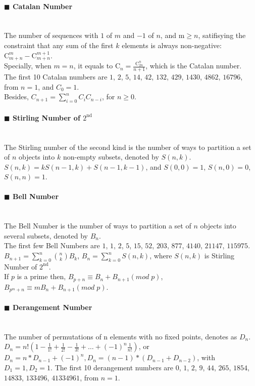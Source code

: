 \documentclass[10pt]{article}
\begin{document}
\paragraph{$\blacksquare$ Catalan Number}
\noindent \\
The number of sequences with $1$ of $m$ and $-1$ of $n$, and m$\ge n$, satifisying the constraint that any sum of the first $k$ elements is always non-negative: $\mathrm{C}_{m+n}^{m}-\mathrm{C}_{m+n}^{m+1}$. \\
Specially, when $m=n$, it equals to $\mathrm{C}_{n}=\frac{\mathrm{C}_{2n}^{n}}{n+1}$, which is the Catalan number. \\
The first 10 Catalan numbers are $1$, $2$, $5$, $14$, $42$, $132$, $429$, $1430$, $4862$, $16796$, from $n=1$, and $C_0=1$. \\
Besides, $C_{n+1}=\sum_{i=0}^{n}C_{i}C_{n-i}$, for $n\ge 0$.
\paragraph{$\blacksquare$ Stirling Number of $\mathrm{2^{nd}}$}
\noindent \\
The Stirling number of the second kind is the number of ways to partition a set of $n$ objects into $k$ non-empty subsets, denoted by $S(n,k)$. \\
$S(n,k)=kS(n-1,k)+S(n-1,k-1)$, and $S(0,0)=1$, $S(n,0)=0$, $S(n,n)=1$.
\paragraph{$\blacksquare$ Bell Number}
\noindent \\
The Bell Number is the number of ways to partition a set of $n$ objects into several subsets, denoted by $B_{n}$. \\
The first few Bell Numbers are $1$, $1$, $2$, $5$, $15$, $52$, $203$, $877$, $4140$, $21147$, $115975$. \\
$B_{n+1}=\sum_{k=0}^{n} \binom{n}{k}B_k$, $B_n=\sum_{k=0}^{n}S(n,k)$, where $S(n,k)$ is Stirling Number of $\mathrm{2^{nd}}$. \\
If $p$ is a prime then, $B_{p+n} \equiv B_n+B_{n+1} (mod \; p)$, $B_{p^m+n} \equiv m B_n + B_{n+1} (mod \; p)$.
\paragraph{$\blacksquare$ Derangement Number}
\noindent \\
The number of permutations of n elements with no fixed points, denotes as $D_n$. \\
$D_n=n!(1-\frac{1}{1!}+\frac{1}{2!}-\frac{1}{3!}+\ldots +{(-1)}^n\frac{1}{n!})$, or $D_n=n*D_{n-1}+{(-1)}^n,D_n=(n-1)*(D_{n-1}+D_{n-2})$, with $D_1=1,D_2=1$.
The first 10 derangement numbers are $0$, $1$, $2$, $9$, $44$, $265$, $1854$, $14833$, $133496$, $41334961$, from $n=1$.
\end{document}
